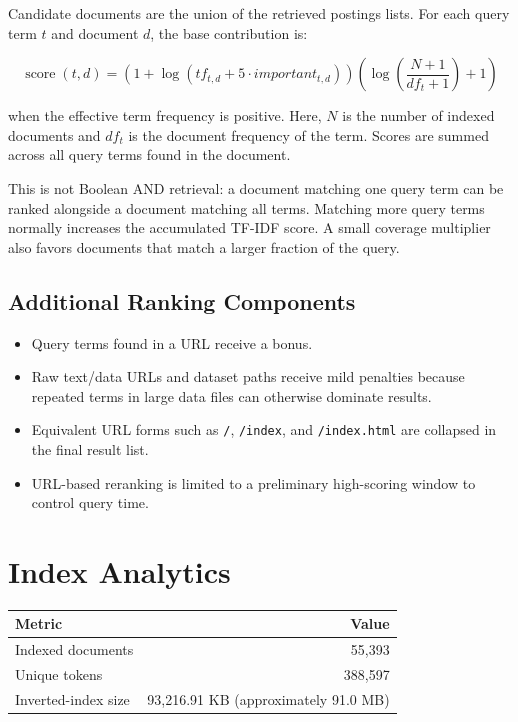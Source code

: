 \documentclass[11pt]{article}
\newcommand{\code}[1]{\texttt{#1}}
\begin{document}
Candidate documents are the union of the retrieved postings lists. For each
query term $t$ and document $d$, the base contribution is:

\[
  \operatorname{score}(t,d) =
  \left(1 + \log(tf_{t,d} + 5 \cdot important_{t,d})\right)
  \left(\log\left(\frac{N+1}{df_t+1}\right)+1\right)
\]

when the effective term frequency is positive. Here, $N$ is the number of
indexed documents and $df_t$ is the document frequency of the term. Scores are
summed across all query terms found in the document.

This is not Boolean AND retrieval: a document matching one query term can be
ranked alongside a document matching all terms. Matching more query terms
normally increases the accumulated TF-IDF score. A small coverage multiplier
also favors documents that match a larger fraction of the query.

\subsection{Additional Ranking Components}

\begin{itemize}
  \item Query terms found in a URL receive a bonus.
  \item Raw text/data URLs and dataset paths receive mild penalties because
  repeated terms in large data files can otherwise dominate results.
  \item Equivalent URL forms such as \code{/}, \code{/index}, and
  \code{/index.html} are collapsed in the final result list.
  \item URL-based reranking is limited to a preliminary high-scoring window to
  control query time.
\end{itemize}

\section{Index Analytics}

\begin{center}
\begin{tabular}{lr}
\toprule
Metric & Value \\
\midrule
Indexed documents & 55,393 \\
Unique tokens & 388,597 \\
Inverted-index size & 93,216.91 KB (approximately 91.0 MB) \\
\bottomrule
\end{tabular}
\end{center}
\end{document}
